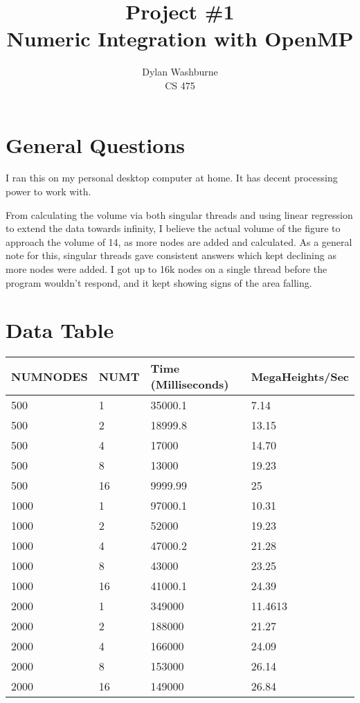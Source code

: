 \documentclass[letterpaper,10pt,onecolumn,draftclsnofoot]{IEEEtran}
\title{Project \#1\\Numeric Integration with OpenMP}
\author{Dylan Washburne\\CS 475}
\begin{document}
\maketitle

\newpage

\section{General Questions}

I ran this on my personal desktop computer at home.  It has decent processing power to work with.

From calculating the volume via both singular threads and using linear regression to extend the data towards infinity, I believe the actual volume of the figure to approach the volume of 14, as more nodes are added and calculated.  As a general note for this, singular threads gave consistent answers which kept declining as more nodes were added.  I got up to 16k nodes on a single thread before the program wouldn't respond, and it kept showing signs of the area falling.

\section{Data Table}

\begin{tabular}{| l | l | l | l |}
	\hline
    NUMNODES & NUMT & Time (Milliseconds) & MegaHeights/Sec\\
    \hline
    500 & 1 & 35000.1 & 7.14\\
    500 & 2 & 18999.8 & 13.15\\
    500 & 4 & 17000 & 14.70\\
    500 & 8 & 13000 & 19.23\\
    500 & 16 & 9999.99 & 25\\
    \hline
    1000 & 1 & 97000.1 & 10.31\\
    1000 & 2 & 52000 & 19.23\\
    1000 & 4 & 47000.2 & 21.28\\
    1000 & 8 & 43000 & 23.25\\
    1000 & 16 & 41000.1 & 24.39\\
    \hline
    2000 & 1 & 349000 & 11.4613\\
    2000 & 2 & 188000 & 21.27\\
    2000 & 4 & 166000 & 24.09\\
    2000 & 8 & 153000 & 26.14\\
    2000 & 16 & 149000 & 26.84\\
    \hline
\end{tabular}
\end{document}

